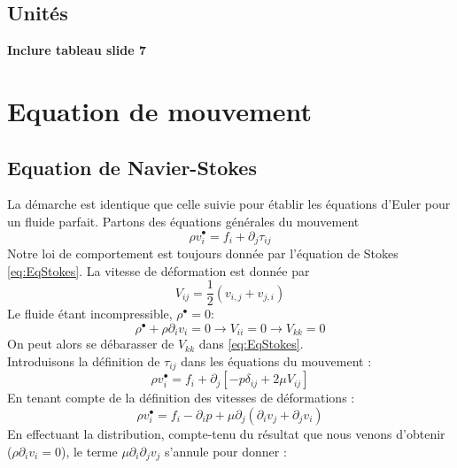 	\subsection{Unités}
	\textbf{Inclure tableau slide 7}
	
\section{Equation de mouvement}
	\subsection{Equation de Navier-Stokes}
	La démarche est identique que celle suivie pour établir les équations d'Euler pour un
	fluide parfait. Partons des équations générales du mouvement
	\begin{equation}
	\rho v_i^\bullet = f_i + \partial_j \tau_{ij}
	\end{equation}		
	Notre loi de comportement est toujours donnée par l'équation de Stokes 
	\autoref{eq:EqStokes}. La vitesse de déformation est donnée par 
	\begin{equation}
	V_{ij} = \frac{1}{2}(v_{i,j} + v_{j,i})
	\end{equation}
	Le fluide étant incompressible, $\rho^\bullet = 0$:
	\begin{equation}
	\rho^\bullet + \rho \partial_iv_i = 0 \rightarrow V_{ii} = 0 \rightarrow V_{kk}=0
	\end{equation}
	On peut alors se débarasser de $V_{kk}$ dans \autoref{eq:EqStokes}.\\
	Introduisons la définition de $\tau_{ij}$ dans les équations du mouvement : 
	\begin{equation}
	\rho v_i^\bullet = f_i + \partial_j[-p\delta_{ij} + 2\mu V_{ij}]
	\end{equation}
	En tenant compte de la définition des vitesses de déformations :
	\begin{equation}
	\rho v_i^\bullet = f_i-\partial_i p + \mu\partial_j(\partial_iv_j+\partial_jv_i)
	\end{equation}
	En effectuant la distribution, compte-tenu du résultat que nous venons d'obtenir 
	($\rho\partial_iv_i=0$), le terme $\mu\partial_i\partial_j v_j$ s'annule pour donner
	:\\
	
	
